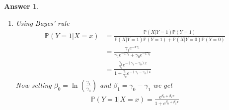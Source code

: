 \documentclass[12pt]{article}
\theoremstyle{colon}
\newtheorem*{answer}{Answer}
\begin{document}
\clearpage

\begin{answer}
  \leavevmode
  \begin{enumerate}[label=\arabic*)]
    \item Using Bayes' rule
      \begin{align*}
        \mathbb{P}(Y=1 | X =x) &= \frac{\mathbb{P}(X | Y=1) \mathbb{P}(Y=1)}{\mathbb{P}(X | Y=1)\mathbb{P}(Y=1) + \mathbb{P}(X | Y=0)\mathbb{P}(Y=0)} \\
        &= \frac{\gamma_1 e^{-x \gamma_1}}{\gamma_1 e^{-x \gamma_1} + \gamma_0 e^{-x \gamma_0}} \\
        &= \frac{\frac{\gamma_1}{\gamma_0} e^{-(\gamma_1 - \gamma_0) x}}{1 + \frac{\gamma_1}{\gamma_0} e^{-(\gamma_1 - \gamma_0) x}}
      \end{align*}
      Now setting $\beta_0 = \ln (\frac{\gamma_1}{\gamma_0})$ and $\beta_1 = \gamma_0 - \gamma_1$ we get
      \begin{gather*}
        \mathbb{P}(Y=1 | X =x) = \frac{e^{\beta_0 + \beta_1 x}}{1 + e^{\beta_0 + \beta_1 x}}
      \end{gather*}


\end{enumerate}
\end{answer}
\end{document}

